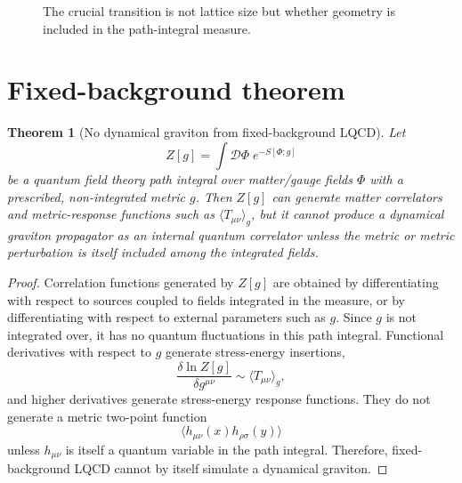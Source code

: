 \documentclass[11pt]{article}
\newtheorem{theorem}{Theorem}
\theoremstyle{remark}
\begin{document}
\begin{figure}[h]
\centering
{}
\caption{The crucial transition is not lattice size but whether geometry is included in the path-integral measure.}
\end{figure}

\section{Fixed-background theorem}

\begin{theorem}[No dynamical graviton from fixed-background LQCD]
Let
\begin{equation}
Z[g]=\int \mathcal D\Phi\;e^{-S[\Phi;g]}
\end{equation}
be a quantum field theory path integral over matter/gauge fields $\Phi$ with a prescribed, non-integrated metric $g$. Then $Z[g]$ can generate matter correlators and metric-response functions such as $\langle T_{\mu\nu}\rangle_g$, but it cannot produce a dynamical graviton propagator as an internal quantum correlator unless the metric or metric perturbation is itself included among the integrated fields.
\end{theorem}

\begin{proof}
Correlation functions generated by $Z[g]$ are obtained by differentiating with respect to sources coupled to fields integrated in the measure, or by differentiating with respect to external parameters such as $g$. Since $g$ is not integrated over, it has no quantum fluctuations in this path integral. Functional derivatives with respect to $g$ generate stress-energy insertions,
\begin{equation}
\frac{\delta \ln Z[g]}{\delta g^{\mu\nu}}\sim \langle T_{\mu\nu}\rangle_g,
\end{equation}
and higher derivatives generate stress-energy response functions. They do not generate a metric two-point function
\begin{equation}
\langle h_{\mu\nu}(x)h_{\rho\sigma}(y)\rangle
\end{equation}
unless $h_{\mu\nu}$ is itself a quantum variable in the path integral. Therefore, fixed-background LQCD cannot by itself simulate a dynamical graviton.
\end{proof}
\end{document}
